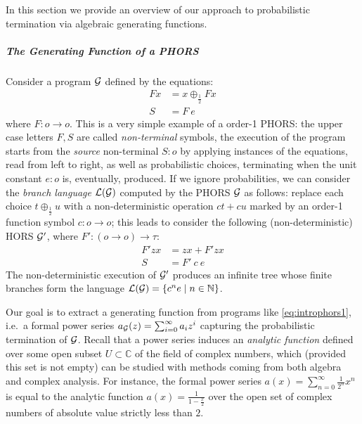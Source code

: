
In this section we provide an overview of our approach to probabilistic termination via algebraic generating functions.

\subparagraph*{The Generating Function of a PHORS}

Consider a program $\mathcal{G}$ defined by the equations:
\begin{equation}\label{eq:introphors1}
\begin{aligned}
Fx&= x\oplus_{\frac{1}{2}} Fx\\
S& =F \  e
\end{aligned}
\end{equation}
where $F:o\to o$. 
This is a very simple example of a order-1 PHORS: the upper case letters $F,S$ are called \emph{non-terminal} symbols, the execution of the program starts from the \emph{source} non-terminal $S:o$ by applying instances of the equations, read from left to right, as well as probabilistic choices, terminating when the unit constant $e:o$ is, eventually, produced. 
If we ignore probabilities, we can consider the \emph{branch language} $\mathcal{L}(\mathcal{G})$ computed by the PHORS $\mathcal{G}$ as follows:
 replace each choice $t\oplus_{\frac{1}{2}}u$ with a non-deterministic operation $ct+cu$ marked by an order-1 function symbol $c:o\to o$; this leads to consider the following (non-deterministic) HORS $\mathcal{G}'$,  where $F':( o\to o)\to \tau$:
\begin{equation}\label{eq:introphors2}
\begin{aligned}
F'zx&=  zx + F'zx\\
S& =F' \ c \ e
\end{aligned}
\end{equation} 
The non-deterministic execution of $\mathcal{G}'$ produces an infinite tree whose finite branches form the language $\mathcal{L}(\mathcal{G})=\{c^{n}e\mid n\in \mathbb{N}\}$.


Our goal is to extract a generating function from programs like \eqref{eq:introphors1}, i.e.~a formal power series $a_{\mathcal{G}}(z)=\sum_{i=0}^\infty a_iz^i$ capturing the probabilistic termination of $\mathcal{G}$. Recall that a power series induces an \emph{analytic function} defined over some open subset $U\subset \mathbb C$ of the field of complex numbers, which (provided this set is not empty) can be studied with methods coming from both algebra and complex analysis. For instance, the formal power series $a(x)=\sum_{n=0}^\infty \frac{1}{2^n} x^n$ is equal to the analytic function $a(x)=\frac{1}{1-\frac{x}{2}}$ over the open set of complex numbers of absolute value strictly less than $ 2$.

